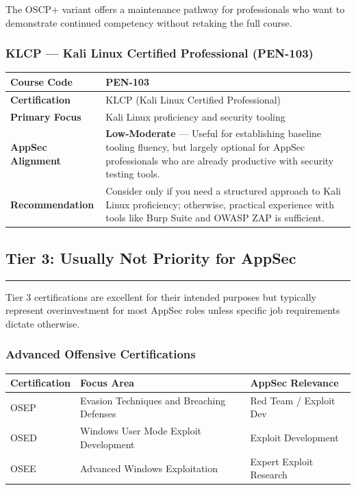 \documentclass[11pt,letterpaper]{article}
\begin{document}
The OSCP+ variant offers a maintenance pathway for professionals who want to demonstrate continued competency without retaking the full course.

\subsubsection{KLCP --- Kali Linux Certified Professional (PEN-103)}

\begin{table}[H]
\centering
\begin{tabularx}{\textwidth}{>{\bfseries}l >{\raggedright\arraybackslash}X}
\toprule
Course Code & PEN-103 \\
\midrule
Certification & KLCP (Kali Linux Certified Professional) \\
\midrule
Primary Focus & Kali Linux proficiency and security tooling \\
\midrule
AppSec Alignment & \textbf{Low-Moderate} --- Useful for establishing baseline tooling fluency, but largely optional for AppSec professionals who are already productive with security testing tools. \\
\midrule
Recommendation & Consider only if you need a structured approach to Kali Linux proficiency; otherwise, practical experience with tools like Burp Suite and OWASP ZAP is sufficient. \\
\bottomrule
\end{tabularx}
\end{table}

\subsection{Tier 3: Usually Not Priority for AppSec}

\textcolor{tier3color}{\rule{\linewidth}{2pt}}

Tier 3 certifications are excellent for their intended purposes but typically represent overinvestment for most AppSec roles unless specific job requirements dictate otherwise.

\subsubsection{Advanced Offensive Certifications}

\begin{table}[H]
\centering
\begin{tabularx}{\textwidth}{l >{\raggedright\arraybackslash}X l}
\toprule
\textbf{Certification} & \textbf{Focus Area} & \textbf{AppSec Relevance} \\
\midrule
OSEP & Evasion Techniques and Breaching Defenses & Red Team / Exploit Dev \\
OSED & Windows User Mode Exploit Development & Exploit Development \\
OSEE & Advanced Windows Exploitation & Expert Exploit Research \\
\bottomrule
\end{tabularx}
\end{table}
\end{document}
